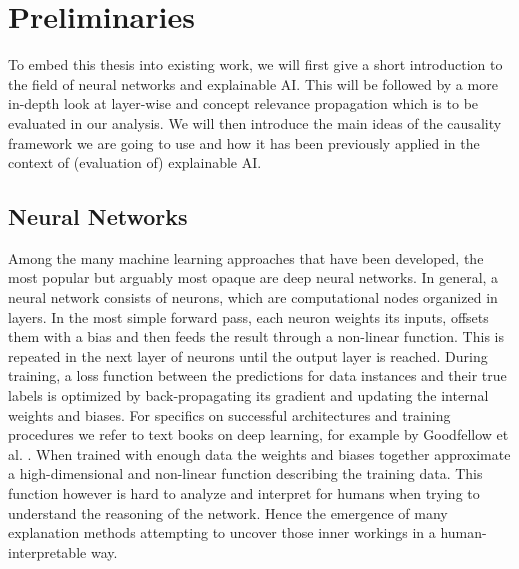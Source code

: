 \chapter{Preliminaries}\label{chapter:background}

To embed this thesis into existing work, we will first give a short introduction to the field of neural networks and explainable AI. This will be followed by a more in-depth look at layer-wise and concept relevance propagation which is to be evaluated in our analysis. We will then introduce the main ideas of the causality framework we are going to use and how it has been previously applied in the context of (evaluation of) explainable AI. 


\section{Neural Networks}
Among the many machine learning approaches that have been developed, the most popular but arguably most opaque are deep neural networks. In general, a neural network consists of neurons, which are computational nodes organized in layers. In the most simple forward pass, each neuron weights its inputs, offsets them with a bias and then feeds the result through a non-linear function. This is repeated in the next layer of neurons until the output layer is reached. During training, a loss function between the predictions for data instances and their true labels is optimized by back-propagating its gradient and updating the internal weights and biases. For specifics on successful architectures and training procedures we refer to text books on deep learning, for example by Goodfellow et al. \cite{Goodfellow2016}. When trained with enough data the weights and biases together approximate a high-dimensional and non-linear function describing the training data. This function however is hard to analyze and interpret for humans when trying to understand the reasoning of the network. Hence the emergence of many explanation methods attempting to uncover those inner workings in a human-interpretable way.


